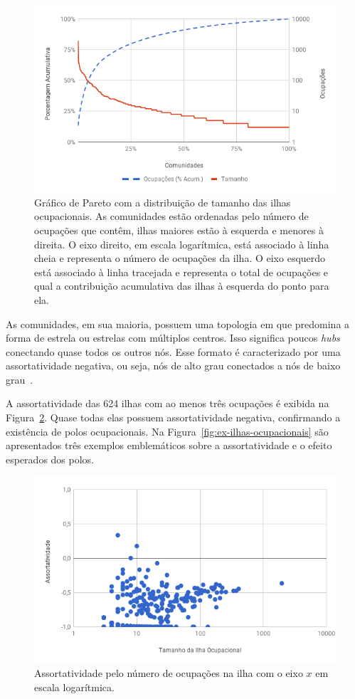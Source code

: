 \documentclass[
  article,
  11pt,
  a4paper,
  english,
  brazil,
  sumario=tradicional]{abntex2}
\begin{document}
\begin{figure}[htb]
    \centering
    \includegraphics[width=0.9\linewidth]{pareto-comunidades.png}
    \caption{Gráfico de Pareto com a distribuição de tamanho das ilhas ocupacionais. As comunidades estão ordenadas pelo número de ocupações que contêm, ilhas maiores estão à esquerda e menores à direita. O eixo direito, em escala logarítmica, está associado à linha cheia e representa o número de ocupações da ilha. O eixo esquerdo está associado à linha tracejada e representa o total de ocupações e qual a contribuição acumulativa das ilhas à esquerda do ponto para ela.}
    \label{fig:pareto-comunidades}
\end{figure}

As comunidades, em sua maioria, possuem uma topologia em que predomina a forma de estrela ou estrelas com múltiplos centros. Isso significa poucos \textit{hubs} conectando quase todos os outros nós. Esse formato é caracterizado por uma assortatividade negativa, ou seja, nós de alto grau conectados a nós de baixo grau~\cite{Barabasi2016-rn}.

A assortatividade das 624 ilhas com ao menos três ocupações é exibida na Figura~\ref{fig:assortatividade}. Quase todas elas possuem assortatividade negativa, confirmando a existência de polos ocupacionais. Na Figura~\ref{fig:ex-ilhas-ocupacionais} são apresentados três exemplos emblemáticos sobre a assortatividade e o efeito esperados dos polos.

\begin{figure}[htb]
    \centering
    \includegraphics[width=0.9\linewidth]{assortatividade.png}
    \caption{Assortatividade pelo número de ocupações na ilha com o eixo $x$ em escala logarítmica.}
    \label{fig:assortatividade}
\end{figure}
\end{document}
